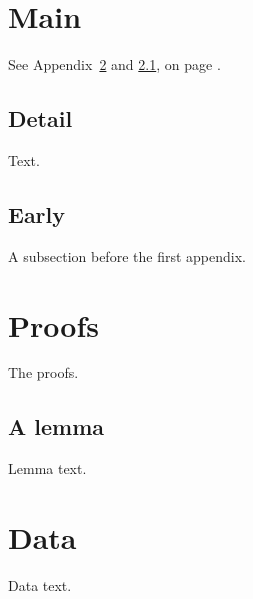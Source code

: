 \documentclass{article}
\begin{document}
\tableofcontents
\section{Main}\label{main}
See Appendix~\ref{app} and \ref{app-sub}, on page \pageref{app}.
\subsection{Detail}
Text.
\appendix
\subsection{Early}
A subsection before the first appendix.
\section{Proofs}\label{app}
The proofs.
\subsection{A lemma}\label{app-sub}
Lemma text.
\section{Data}
Data text.
\end{document}
